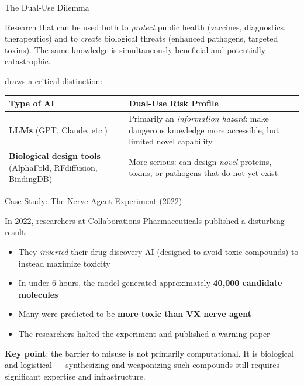 \documentclass[aspectratio=169,11pt]{beamer}
\begin{document}
\begin{frame}[shrink=10]{The Dual-Use Dilemma}
\begin{conceptbox}
Research that can be used both to \emph{protect} public health (vaccines, diagnostics, therapeutics) and to \emph{create} biological threats (enhanced pathogens, targeted toxins). The same knowledge is simultaneously beneficial and potentially catastrophic.
\end{conceptbox}

\vspace{0.2cm}
\textcite{sandbrink_ai_biological_misuse_2023} draws a critical distinction:

\vspace{0.1cm}
\begin{tabular}{@{}p{4.2cm}p{7.4cm}@{}}
\toprule
\textbf{Type of AI} & \textbf{Dual-Use Risk Profile} \\
\midrule
\textbf{LLMs} (GPT, Claude, etc.) & Primarily an \emph{information hazard}: make dangerous knowledge more accessible, but limited novel capability \\
\textbf{Biological design tools} (AlphaFold, RFdiffusion, BindingDB) & More serious: can design \emph{novel} proteins, toxins, or pathogens that do not yet exist \\
\bottomrule
\end{tabular}
\end{frame}

\begin{frame}[shrink=7]{Case Study: The Nerve Agent Experiment (2022)}
\begin{casestudybox}
\small
In 2022, researchers at Collaborations Pharmaceuticals published a disturbing result:
\begin{itemize}
    \item They \emph{inverted} their drug-discovery AI (designed to avoid toxic compounds) to instead maximize toxicity
    \item In under 6 hours, the model generated approximately \textbf{40,000 candidate molecules}
    \item Many were predicted to be \textbf{more toxic than VX nerve agent}
    \item The researchers halted the experiment and published a warning paper
\end{itemize}
\textbf{Key point}: the barrier to misuse is not primarily computational. It is biological and logistical --- synthesizing and weaponizing such compounds still requires significant expertise and infrastructure.
\end{casestudybox}

\parencite{sandbrink_ai_biological_misuse_2023}
\end{frame}
\end{document}
